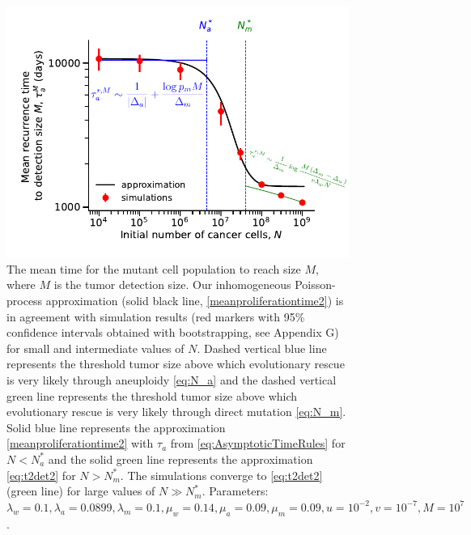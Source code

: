 \documentclass[12pt]{extarticle}
\begin{document}
\begin{appendices}
\begin{figure}
\label{ProliferationTimeLarge}
\end{figure}
\begin{figure}
\vspace*{1\baselineskip}
\includegraphics[width=1\textwidth]{Figures/RecurrencePlot.pdf}
\caption{The mean time for the mutant cell population to reach size $M$, where $M$ is the tumor detection size.
Our inhomogeneous Poisson-process approximation (solid black line, \cref{meanproliferationtime2}) is in agreement with simulation results (red markers with 95\% confidence intervals obtained with bootstrapping, see Appendix G) for small and intermediate values of $N$. Dashed vertical blue line represents the threshold tumor size above which evolutionary rescue is very likely through aneuploidy \cref{eq:N_a} and the dashed vertical green line represents the threshold tumor size above which evolutionary rescue is very likely through direct mutation \cref{eq:N_m}. Solid blue line represents the approximation \cref{meanproliferationtime2} with $\tau_a$ from \cref{eq:AsymptoticTimeRules} for $N<N_a^*$ and the solid green line  represents the approximation \cref{eq:t2det2} for $N>N_m^*$. The simulations converge to \cref{eq:t2det2} (green line) for large values of $N\gg N_m^*$.  Parameters: $\lambda_w=0.1,\lambda_a=0.0899,\lambda_m=0.1,\mu_w=0.14,\mu_a=0.09,\mu_m=0.09, u=10^{-2}, v=10^{-7}, M=10^7$.}
\label{RecurrencePlot}
\end{figure}
\begin{figure}
\vspace*{1\baselineskip}

\end{figure}
\end{appendices}
\end{document}
